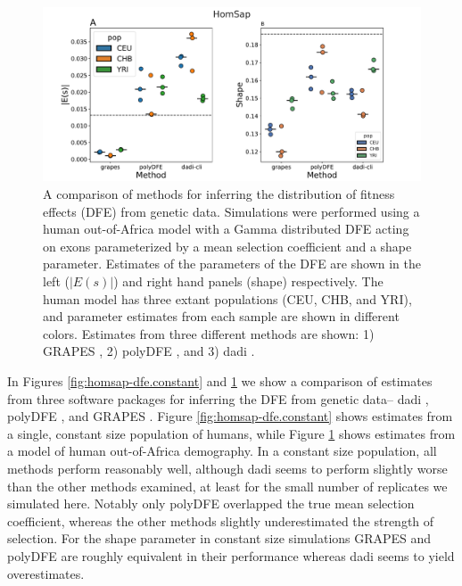 \documentclass[hidelinks]{article}
\begin{document}
    \begin{figure}[htbp]
        \centering
        \includegraphics[width=\linewidth]{figures/HomSap/OOA/HomSap_OutOfAfricaArchaicAdmixture_5R19_Gamma_K17_ensembl_havana_104_exons_DFE_plot}
        \caption{A comparison of methods for inferring the distribution of fitness effects (DFE) from genetic data.
        Simulations were performed using a human out-of-Africa model \citep{ragsdale2019models} with a Gamma distributed DFE
        acting on exons parameterized by a mean selection coefficient and a shape parameter. Estimates of the 
        parameters of the DFE are shown in the left ($\lvert E(s) \rvert $) and right hand panels (shape) respectively.
        The human model has three extant populations (CEU, CHB, and YRI), and parameter estimates from each
        sample are shown in different colors.
        Estimates from three different methods are shown: 1) GRAPES \cite{galtier2016adaptive}, 2) polyDFE \citep{tataru2020polydfe},
        and 3) dadi \citep{gutenkunst2009inferring}.}
        \label{fig:homsap-dfe.ooa}
    \end{figure}

    In Figures \ref{fig:homsap-dfe.constant} and \ref{fig:homsap-dfe.ooa} we show a comparison of estimates
    from three software packages for inferring the DFE from genetic data-- 
    dadi \citep{gutenkunst2009inferring}, polyDFE \citep{tataru2020polydfe}, 
    and GRAPES \citep{galtier2016adaptive}. 
    Figure \ref{fig:homsap-dfe.constant} shows estimates from a single, constant size population of humans, 
    while Figure \ref{fig:homsap-dfe.ooa} shows estimates from a model of human out-of-Africa demography.
    In a constant size population, all methods perform reasonably well, although dadi seems to
    perform slightly worse than the other methods examined, at least for the small number of replicates we simulated here.
    Notably only polyDFE overlapped the true mean selection coefficient, whereas 
    the other methods slightly underestimated the strength of selection. 
    For the shape parameter in constant size simulations GRAPES and polyDFE are roughly
    equivalent in their performance whereas dadi seems to yield overestimates. 
    
\end{document}
